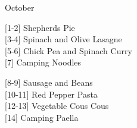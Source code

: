 		\begin{menu}{October}
    
    \begin{recipelist}
    
        {\scriptsize[1-2]} Shepherds Pie\\
        {\scriptsize[3-4]} Spinach and Olive Lasagne\\
        {\scriptsize[5-6]} Chick Pea and Spinach Curry\\
        {\scriptsize[7]} Camping Noodles\\%
    \end{recipelist}%
    \begin{recipelist}
    
        {\scriptsize[8-9]} Sausage and Beans\\
        {\scriptsize[10-11]} Red Pepper Pasta\\
        {\scriptsize[12-13]} Vegetable Cous Cous\\
        {\scriptsize[14]} Camping Paella\\%
    \end{recipelist}\par%
  

\end{menu}
